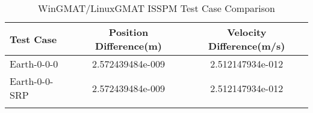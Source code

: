 \begin{table}[htbp!]
\centering
\caption{ WinGMAT/LinuxGMAT ISSPM Test Case Comparison}
      \begin{tabular}{lcc}
      \hline\hline
          Test Case & Position Difference(m) & Velocity Difference(m/s) \\
         \hline
         Earth-0-0-0 & 2.572439484e-009 & 2.512147934e-012 \\
         Earth-0-0-SRP & 2.572439484e-009 & 2.512147934e-012 \\
      \hline\hline
      \label{Table: ISSPM WinGMAT-LinuxGMAT Table} 
\end{tabular}
\end{table}
